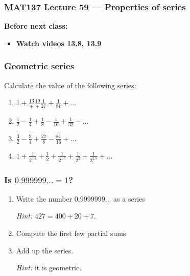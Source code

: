 \documentclass[14pt]{beamer}
\newcommand{\p}{\pause}
\newcommand{\setsize}[1]{\fontsize{#1}{#1}\selectfont} %
\newcommand{\smallerfont}{\setsize{13}} %
\newcommand{\vv}{\vspace{.5cm}}
\begin{document}
\begin{frame}
	\frametitle{MAT137 Lecture 59 --- Properties of series  }

	\vfill
	{\bf Before next class:}
		\begin{itemize} \normalsize
			\item {\bf Watch videos 13.8, 13.9 }
		\end{itemize}
\end{frame}

	\begin{frame}[t]
		\smallerfont
		\frametitle{Geometric series}

		Calculate the value of the following series:

		\begin{enumerate}
			\item ${\displaystyle 1 + \frac{13}{+} \frac{19}{+} \frac{1}{27} + \frac{1}{81} + \ldots}$
				\vv

			\item ${\displaystyle \frac{1}{2} - \frac{1}{4} + \frac{1}{8} - \frac{1}{16} + \frac{1}{32} - \ldots}$
				\vv

			\item ${\displaystyle \frac{3}{2} - \frac{9}{4} + \frac{27}{8} - \frac{81}{16} + \ldots}$
				\vv

			\item ${\displaystyle  1 + \frac{1}{2^{0.5}} + \frac{1}{2} + \frac{1}{2^{1.5}} + \frac{1}{2^{2}} + \frac{1}{2^{2.5}} + \ldots}$
				\vv
		\end{enumerate}
	\end{frame}

	\begin{frame}[t]
		\frametitle{Is ${\displaystyle 0.999999\ldots = 1}$?}

		\p
		\begin{enumerate}
			\item Write the number \; ${\displaystyle 0.9999999\ldots}$ \; as a series

				\emph{Hint:} ${\displaystyle 427 = 400 + 20 + 7}$. \vv

			\item Compute the first few partial sums \vv

			\item Add up the series.

				\emph{Hint:} it is geometric.
		\end{enumerate}
	\end{frame}
\end{document}
